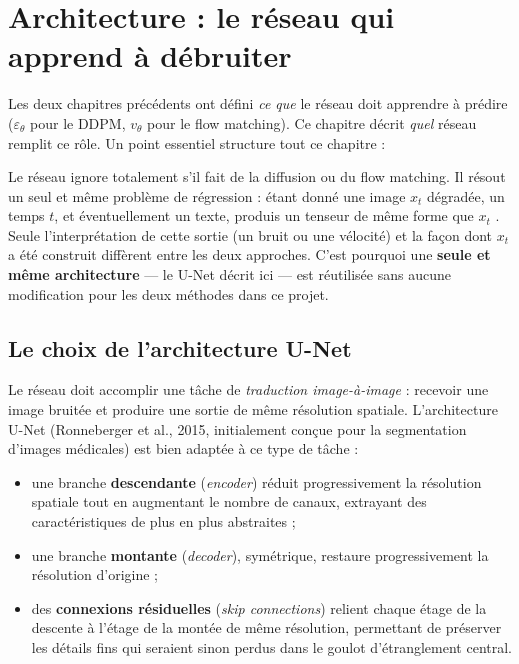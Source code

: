 \chapter{Architecture : le réseau qui apprend à débruiter}
\label{chap:architecture}

Les deux chapitres précédents ont défini \emph{ce que} le réseau doit apprendre à prédire
($\varepsilon_\theta$ pour le DDPM, $v_\theta$ pour le flow matching). Ce chapitre décrit \emph{quel}
réseau remplit ce rôle. Un point essentiel structure tout ce chapitre :

\begin{intuition}
Le réseau ignore totalement s'il fait de la diffusion ou du flow matching. Il résout un seul et même
problème de régression : \og étant donné une image $x_t$ dégradée, un temps $t$, et éventuellement un
texte, produis un tenseur de même forme que $x_t$ \fg. Seule l'interprétation de cette sortie (un
bruit ou une vélocité) et la façon dont $x_t$ a été construit diffèrent entre les deux approches. C'est
pourquoi une \textbf{seule et même architecture} — le U-Net décrit ici — est réutilisée sans aucune
modification pour les deux méthodes dans ce projet.
\end{intuition}

\section{Le choix de l'architecture U-Net}

Le réseau doit accomplir une tâche de \emph{traduction image-à-image} : recevoir une image bruitée et
produire une sortie de même résolution spatiale. L'architecture U-Net (Ronneberger et al., 2015,
initialement conçue pour la segmentation d'images médicales) est bien adaptée à ce type de tâche :

\begin{itemize}
    \item une branche \textbf{descendante} (\emph{encoder}) réduit progressivement la résolution
    spatiale tout en augmentant le nombre de canaux, extrayant des caractéristiques de plus en plus
    abstraites ;
    \item une branche \textbf{montante} (\emph{decoder}), symétrique, restaure progressivement la
    résolution d'origine ;
    \item des \textbf{connexions résiduelles} (\emph{skip connections}) relient chaque étage de la
    descente à l'étage de la montée de même résolution, permettant de préserver les détails fins qui
    seraient sinon perdus dans le goulot d'étranglement central.
\end{itemize}

